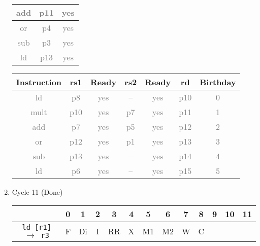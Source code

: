 \documentclass[12pt]{article}
\begin{document}
\begin{enumerate}
\begin{table}[H]
\begin{tabular}{|c|c|c|}
					\textcolor{gray}{add} & \textcolor{gray}{p11} & \textcolor{gray}{yes}\\
					\hline
					\textcolor{gray}{or} & \textcolor{gray}{p4} & \textcolor{gray}{yes}\\
					\hline
					\textcolor{gray}{sub} & \textcolor{gray}{p3} & \textcolor{gray}{yes}\\
					\hline
					\textcolor{gray}{ld} & \textcolor{gray}{p13} & \textcolor{gray}{yes}\\
					\hline
				\end{tabular}
				\hfill
				\begin{tabular}{|c|c|c|c|c|c|c|}
					\hline
					Instruction & rs1 & Ready & rs2 & Ready & rd & Birthday\\
					\hline
					\textcolor{gray}{ld} & \textcolor{gray}{p8} & \textcolor{gray}{yes} & \textcolor{gray}{--} & \textcolor{gray}{yes} & \textcolor{gray}{p10} & \textcolor{gray}{0}\\
					\hline
					\textcolor{gray}{mult} & \textcolor{gray}{p10} & \textcolor{gray}{yes} & \textcolor{gray}{p7} & \textcolor{gray}{yes} & \textcolor{gray}{p11} & \textcolor{gray}{1}\\
					\hline
					\textcolor{gray}{add} & \textcolor{gray}{p7} & \textcolor{gray}{yes} & \textcolor{gray}{p5} & \textcolor{gray}{yes} & \textcolor{gray}{p12} & \textcolor{gray}{2}\\
					\hline
					\textcolor{gray}{or} & \textcolor{gray}{p12} & \textcolor{gray}{yes} & \textcolor{gray}{p1} & \textcolor{gray}{yes} & \textcolor{gray}{p13} & \textcolor{gray}{3}\\
					\hline
					\textcolor{gray}{sub} & \textcolor{gray}{p13} & \textcolor{gray}{yes} & \textcolor{gray}{--} & \textcolor{gray}{yes} & \textcolor{gray}{p14} & \textcolor{gray}{4}\\
					\hline
					\textcolor{gray}{ld} & \textcolor{gray}{p6} & \textcolor{gray}{yes} & \textcolor{gray}{--} & \textcolor{gray}{yes} & \textcolor{gray}{p15} & \textcolor{gray}{5}\\
					\hline
				\end{tabular}
			\end{table}
		\item
			Cycle 11 (Done)
			\begin{table}[H]
				\begin{tabular}{|c|c|c|c|c|c|c|c|c|c|c|c|c|}
					\hline
					 & 0 & 1 & 2 & 3 & 4 & 5 & 6 & 7 & 8 & 9 & 10 & 11\\
					\hline
					\texttt{ld [r1] $\rightarrow$ r3} & F & Di & I & RR & X & M1 & M2 & W & C &  &  &\\

\end{tabular}
\end{table}
\end{enumerate}
\end{document}
